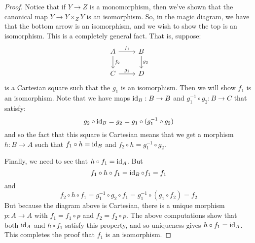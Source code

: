 \documentclass[12pt]{exam}
\begin{document}
\begin{proof}
	Notice that if $Y \to Z$ is a monomorphism, then we've shown that the canonical map $Y \to Y \times_Z Y$ is an isomorphism. So, in the magic diagram, we have that the bottom arrow is an isomorphism, and we wish to show the top is an isomorphism. This is a completely general fact. That is, suppose:
	\[ \begin{tikzcd} A \arrow{r}{f_1} \arrow{d}{f_2} & B \arrow{d}{g_2} \\ C \arrow{r}{g_1} & D \end{tikzcd} \]
	is a Cartesian square such that the $g_1$ is an isomorphism. Then we will show $f_1$ is an isomorphism. Note that we have maps $\operatorname{id}_B : B \to B$ and $g_1^{-1} \circ g_2 : B \to C$ that satisfy:
	\[ g_2 \circ \operatorname{id}_B = g_2 = g_1 \circ (g_1^{-1} \circ g_2) \]
	and so the fact that this square is Cartesian means that we get a morphism $h : B \to A$ such that $f_1 \circ h = \operatorname{id}_B$ and $f_2 \circ h = g_1^{-1} \circ g_2$.
	
	Finally, we need to see that $h \circ f_1 = \operatorname{id}_A$. But
	\[ f_1 \circ h \circ f_1 = \operatorname{id}_B \circ f_1 = f_1 \]
	and
	\[ f_2 \circ h \circ f_1 = g_1^{-1} \circ g_2 \circ f_1 = g_1^{-1} \circ (g_1 \circ f_2) = f_2 \]
	But because the diagram above is Cartesian, there is a unique morphism $p : A \to A$ with $f_1 = f_1 \circ p$ and $f_2 = f_2 \circ p$. The above computations show that both $\operatorname{id}_A$ and $h \circ f_1$ satisfy this property, and so uniqueness gives $h \circ f_1 = \operatorname{id}_A$. This completes the proof that $f_1$ is an isomorphism.
\end{proof}
\end{document}
